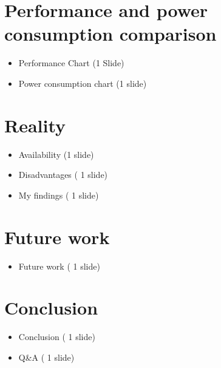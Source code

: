 \documentclass[11pt]{article}       %
\newenvironment{slide}[1]        {\section{#1} \begin{itemize}}%
                                 {\end{itemize}}
\begin{document}
\begin{slide}{Performance and power consumption comparison}
\item Performance Chart (1 Slide)
\item Power consumption chart (1 slide)

\end{slide}


\begin{slide}{Reality}
\item Availability (1 slide)
\item Disadvantages ( 1 slide)
\item My findings ( 1 slide) 
\end{slide}



\begin{slide}{Future work}
\item Future work ( 1 slide) 
\end{slide}


\begin{slide}{Conclusion}
\item Conclusion ( 1 slide) 
\item Q\&A ( 1 slide)
\end{slide}






\end{document}
